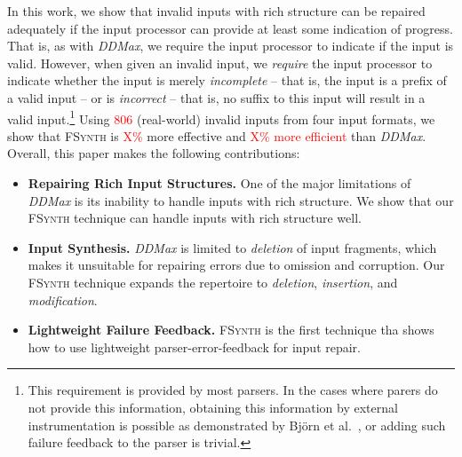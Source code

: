 \documentclass[sigconf,review,anonymous]{acmart}
\newcounter{todocounter}
\newcommand{\todo}[1]{\marginpar{$|$}\textcolor{red}{\stepcounter{todocounter}\footnote[\thetodocounter]{\textcolor{red}{\textbf{TODO }}\textit{#1}}}}
\newcommand{\recheck}[1]{\textcolor{red}{#1}}
\renewcommand{\todo}[1]{}
\newcommand{\ddmax}{\textit{DDMax}\xspace}
\newcommand{\brepair}{\textsc{FSynth}\xspace}
\begin{document}
\todo{we need to emphasize the main novelty here, i.e, first to do X, to the best of our knowledge }
In this work, we %
show that invalid inputs with rich structure can be repaired adequately if
the input processor can provide at least some indication of progress.
That is, as with \ddmax, we require the input processor to indicate if the input
is valid.  However, when given an invalid input, we \textit{require} the input processor
to indicate whether the input is merely \emph{incomplete} -- that is, the input
is a prefix of a valid input -- or is \emph{incorrect} -- that is, no suffix to
this input will result in a valid input.\footnote{This requirement is
provided by most parsers. %
In the cases where parers do not provide
this information, obtaining this information by external instrumentation is
possible as demonstrated by Bj\"orn et al.~\cite{mathis2019parser}, or
adding such failure feedback to the parser %
is trivial.
}
Using \recheck{806} (real-world) invalid inputs from four input formats, we show that %
\brepair is \recheck{X\%} more effective and \recheck{X\% more efficient} %
than \ddmax.
Overall, this paper makes the following %
contributions\todo{we need to stress some results here}:
\begin{itemize}
\item \textbf{Repairing Rich Input Structures.} One of the major limitations of
\ddmax is its inability to handle inputs with rich structure. We show that our
\brepair technique can handle inputs with rich structure well.
\item \textbf{Input Synthesis.} \ddmax is limited to \emph{deletion} of input
fragments, which makes it unsuitable for repairing errors due to omission and
corruption. Our \brepair technique expands the repertoire to \emph{deletion},
\emph{insertion}, and \emph{modification}.
\item \textbf{Lightweight Failure Feedback.} \brepair is the first technique
tha shows how to use lightweight parser-error-feedback for input repair.
\end{itemize}
\end{document}
